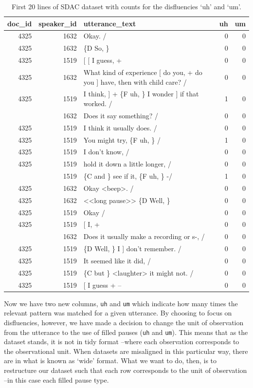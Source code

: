 \documentclass[
  letterpaper,
]{scrbook}
\begin{document}
\hypertarget{tbl-td-sdac-count-disfluencies-show}{}
\begin{table}
\caption{\label{tbl-td-sdac-count-disfluencies-show}First 20 lines of SDAC dataset with counts for the disfluencies `uh' and
`um'. }\tabularnewline

\centering
\begin{tabular}{rrlrr}
\toprule
doc\_id & speaker\_id & utterance\_text & uh & um\\
\midrule
4325 & 1632 & Okay.  / & 0 & 0\\
4325 & 1632 & \{D So, \} & 0 & 0\\
4325 & 1519 & {}[ [ I guess, + & 0 & 0\\
4325 & 1632 & What kind of experience [ do you, + do you ] have, then with child care? / & 0 & 0\\
4325 & 1519 & I think, ] + \{F uh, \} I wonder ] if that worked. / & 1 & 0\\
\addlinespace
4325 & 1632 & Does it say something? / & 0 & 0\\
4325 & 1519 & I think it usually does.  / & 0 & 0\\
4325 & 1519 & You might try, \{F uh, \}  / & 1 & 0\\
4325 & 1519 & I don't know,  / & 0 & 0\\
4325 & 1519 & hold it down a little longer,  / & 0 & 0\\
\addlinespace
4325 & 1519 & \{C and \} see if it, \{F uh, \} -/ & 1 & 0\\
4325 & 1632 & Okay <beep>.  / & 0 & 0\\
4325 & 1632 & <<long pause>> \{D Well, \} & 0 & 0\\
4325 & 1519 & Okay  / & 0 & 0\\
4325 & 1519 & {}[ I, + & 0 & 0\\
\addlinespace
4325 & 1632 & Does it usually make a recording or s-, / & 0 & 0\\
4325 & 1519 & \{D Well, \} I ] don't remember.  / & 0 & 0\\
4325 & 1519 & It seemed like it did,  / & 0 & 0\\
4325 & 1519 & \{C but \} <laughter> it might not.  / & 0 & 0\\
4325 & 1519 & {}[ I guess + -- & 0 & 0\\
\bottomrule
\end{tabular}
\end{table}

Now we have two new columns, \texttt{uh} and \texttt{um} which indicate
how many times the relevant pattern was matched for a given utterance.
By choosing to focus on disfluencies, however, we have made a decision
to change the unit of observation from the utterance to the use of
filled pauses (\texttt{uh} and \texttt{um}). This means that as the
dataset stands, it is not in tidy format --where each observation
corresponds to the observational unit. When datasets are misaligned in
this particular way, there are in what is known as `wide' format. What
we want to do, then, is to restructure our dataset such that each row
corresponds to the unit of observation --in this case each filled pause
type.
\end{document}
